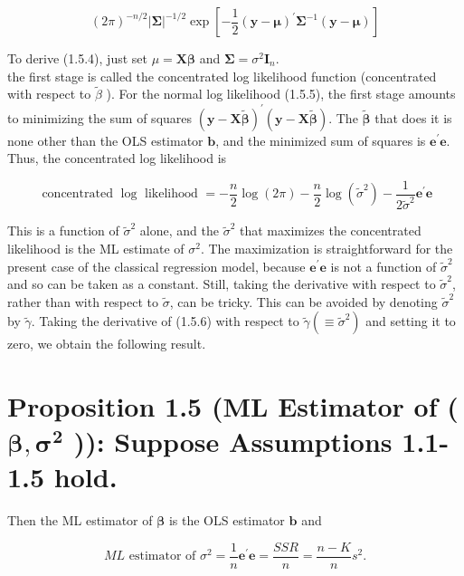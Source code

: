 \documentclass[10pt]{article}
\begin{document}
$$
(2 \pi)^{-n / 2}|\boldsymbol{\Sigma}|^{-1 / 2} \exp \left[-\frac{1}{2}(\mathbf{y}-\boldsymbol{\mu})^{\prime} \boldsymbol{\Sigma}^{-1}(\mathbf{y}-\boldsymbol{\mu})\right]
$$

To derive (1.5.4), just set $\mu=\mathbf{X} \boldsymbol{\beta}$ and $\boldsymbol{\Sigma}=\sigma^{2} \mathbf{I}_{n}$.\\
the first stage is called the concentrated log likelihood function (concentrated with respect to $\widetilde{\beta}$ ). For the normal log likelihood (1.5.5), the first stage amounts to minimizing the sum of squares $(\mathbf{y}-\mathbf{X} \widetilde{\boldsymbol{\beta}})^{\prime}(\mathbf{y}-\mathbf{X} \widetilde{\boldsymbol{\beta}})$. The $\widetilde{\boldsymbol{\beta}}$ that does it is none other than the OLS estimator $\mathbf{b}$, and the minimized sum of squares is $\mathbf{e}^{\prime} \mathbf{e}$. Thus, the concentrated log likelihood is


\begin{equation*}
\text { concentrated } \log \text { likelihood }=-\frac{n}{2} \log (2 \pi)-\frac{n}{2} \log \left(\tilde{\sigma}^{2}\right)-\frac{1}{2 \tilde{\sigma}^{2}} \mathbf{e}^{\prime} \mathbf{e} \tag{1.5.6}
\end{equation*}


This is a function of $\tilde{\sigma}^{2}$ alone, and the $\tilde{\sigma}^{2}$ that maximizes the concentrated likelihood is the ML estimate of $\sigma^{2}$. The maximization is straightforward for the present case of the classical regression model, because $\mathbf{e}^{\prime} \mathbf{e}$ is not a function of $\tilde{\sigma}^{2}$ and so can be taken as a constant. Still, taking the derivative with respect to $\tilde{\sigma}^{2}$, rather than with respect to $\tilde{\sigma}$, can be tricky. This can be avoided by denoting $\tilde{\sigma}^{2}$ by $\tilde{\gamma}$. Taking the derivative of (1.5.6) with respect to $\tilde{\gamma}\left(\equiv \tilde{\sigma}^{2}\right)$ and setting it to zero, we obtain the following result.

\section*{Proposition 1.5 (ML Estimator of ( $\boldsymbol{\beta}, \boldsymbol{\sigma}^{\mathbf{2}}$ )): Suppose Assumptions 1.1-1.5 hold.}
Then the ML estimator of $\boldsymbol{\beta}$ is the OLS estimator $\mathbf{b}$ and


\begin{equation*}
M L \text { estimator of } \sigma^{2}=\frac{1}{n} \mathbf{e}^{\prime} \mathbf{e}=\frac{S S R}{n}=\frac{n-K}{n} s^{2} . \tag{1.5.7}
\end{equation*}
\end{document}
